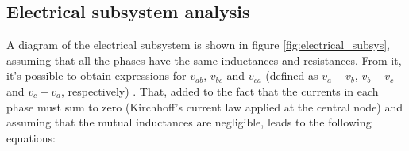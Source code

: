 \documentclass{article}
\begin{document}
    \newpage

%




    \subsection{Electrical subsystem analysis}
    \label{sec:elec_subsystem}

    A diagram of the electrical subsystem is shown in figure \ref{fig:electrical_subsys}, assuming that all the phases have the same inductances and resistances. From it, it's possible to obtain expressions for $v_{ab}$, $v_{bc}$ and $v_{ca}$ (defined as $v_a-v_b$, $v_b-v_c$ and $v_c-v_a$, respectively) \cite[p. 457-459]{ref:electrical_modeling}. That, added to the fact that the currents in each phase must sum to zero (Kirchhoff's current law applied at the central node) and assuming that the mutual inductances are negligible, leads to the following equations:
\end{document}
